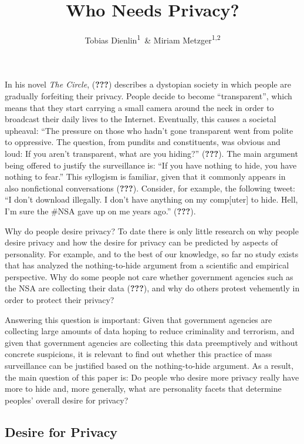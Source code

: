 \documentclass[man]{apa6}
\title{Who Needs Privacy?}
\author{Tobias Dienlin\textsuperscript{1}~\& Miriam Metzger\textsuperscript{1,2}}
\date{}
\affiliation{
\vspace{0.5cm}
\textsuperscript{1} University of Hohenheim\\\textsuperscript{2} University of California, Santa Barbara}
\theoremstyle{definition}
\theoremstyle{definition}
\theoremstyle{definition}
\theoremstyle{remark}
\begin{document}
\maketitle

In his novel \emph{The Circle}, ({\textbf{???}}) describes a dystopian
society in which people are gradually forfeiting their privacy. People
decide to become \enquote{transparent}, which means that they start
carrying a small camera around the neck in order to broadcast their
daily lives to the Internet. Eventually, this causes a societal
upheaval: \enquote{The pressure on those who hadn't gone transparent
went from polite to oppressive. The question, from pundits and
constituents, was obvious and loud: If you aren't transparent, what are
you hiding?} ({\textbf{???}}). The main argument being offered to
justify the surveillance is: \enquote{If you have nothing to hide, you
have nothing to fear.} This syllogism is familiar, given that it
commonly appears in also nonfictional conversations ({\textbf{???}}).
Consider, for example, the following tweet: \enquote{I don't download
illegally. I don't have anything on my comp{[}uter{]} to hide. Hell, I'm
sure the \#NSA gave up on me years ago.} ({\textbf{???}}).

Why do people desire privacy? To date there is only little research on
why people desire privacy and how the desire for privacy can be
predicted by aspects of personality. For example, and to the best of our
knowledge, so far no study exists that has analyzed the nothing-to-hide
argument from a scientific and empirical perspective. Why do some people
not care whether government agencies such as the NSA are collecting
their data ({\textbf{???}}), and why do others protest vehemently in
order to protect their privacy?

Answering this question is important: Given that government agencies are
collecting large amounts of data hoping to reduce criminality and
terrorism, and given that government agencies are collecting this data
preemptively and without concrete suspicions, it is relevant to find out
whether this practice of mass surveillance can be justified based on the
nothing-to-hide argument. As a result, the main question of this paper
is: Do people who desire more privacy really have more to hide and, more
generally, what are personality facets that determine peoples' overall
desire for privacy?

\hypertarget{desire-for-privacy}{%
\subsection{Desire for Privacy}\label{desire-for-privacy}}
\end{document}
